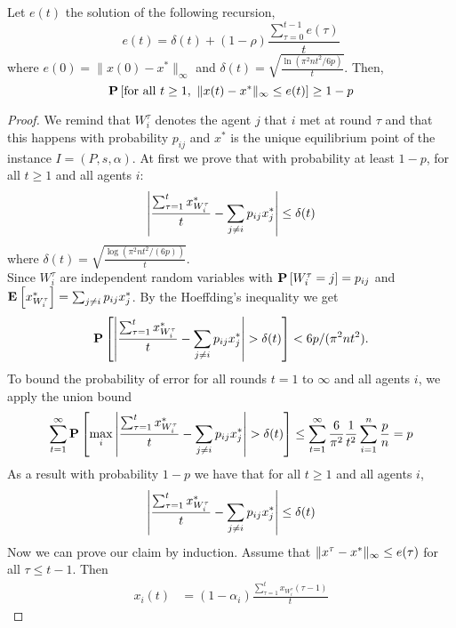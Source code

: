 \begin{lemma}\label{l:recursive_equation}
Let $e(t)$ the solution of the following recursion,
\[e(t) =\delta(t) + (1-\rho)\frac{\sum_{\tau=0}^{t-1}e(\tau)}{t}\]
where $e(0)=\|x(0) - x^*\|_{\infty}$ and \(\delta(t) = \sqrt{\frac{\ln(\pi^2n t^2/6p)}{t}} \). Then,
\[\bm{\mathrm{P}}\left[\text{for all }t \geq 1, ~\| x(t)-x^* \|_{\infty}\leq e(t)\right] \geq 1-p\] 
\end{lemma}
\begin{proof}
We remind that $W_i^\tau$ denotes the agent
$j$ that $i$ met at round $\tau$ and that this happens 
with probability $p_{ij}$ and $x^*$ is the unique equilibrium point 
of the instance $I=(P,s,\alpha)$. At first we prove that
with probability at least $1-p$, for all $t \geq 1$ and all agents $i$:
\begin{equation}\label{eq:error_per_round}
    \left|
    \frac{\sum_{\tau=1}^t x^*_{W_i^\tau}}{t} -
    \sum_{j \neq i} p_{ij} x^*_j
    \right| \leq \delta(t)
\end{equation}
where $\delta(t) = \sqrt{ \frac{\log(\pi^2 n t^2/(6 p))}{t}}$.\\
Since $W_i^\tau$ are independent random variables with 
$\bm{\mathrm{P}}\left[W_i^\tau = j\right]=p_{ij}$ and \(\Exp{x^*_{W_i^\tau}} = \sum_{j \neq i} p_{ij} x^*_j\).
By the Hoeffding's inequality we get
  \[
    \bm{\mathrm{P}}\left[
      \left|
      \frac{\sum_{\tau = 1}^{t} x^*_{W_i^\tau}}{t}
      - \sum_{j \neq i} p_{ij} x^*_j \right|
      > \delta(t)
     \right]
    < 6 p / (\pi^2 n t^2).
  \]
To bound the probability of error for all rounds $t=1$ to $\infty$
and all agents $i$, we apply the union bound
  \begin{align*}
    \sum_{t=1}^{\infty}
    \bm{\mathrm{P}}\left[ \max_{i}
      \left|
      \frac{\sum_{\tau = 1}^{t} x^*_{W_i^{\tau}}}{t}
      - \sum_{j \neq i} p_{ij} x^*_j \right|
      > \delta(t)\right]
    \leq
    \sum_{t=1}^{\infty} \frac{6}{\pi^2} \frac{1}{t^2} \sum_{i=1}^n \frac{p}{n} =
    p
  \end{align*}
\noindent As a result with probability $1-p$ we have that for all $t\geq 1$ and all agents $i$,
  \begin{equation}\label{eq:error_per_round}
    \left|
    \frac{\sum_{\tau=1}^t x^*_{W_i^\tau}}{t} -
    \sum_{j \neq i} p_{ij} x^*_j
    \right| \leq \delta(t)
  \end{equation}
\noindent Now we can prove our claim by induction. Assume that $\| x^{\tau}-x^* \|_{\infty} \leq e(\tau)$ for all 
$\tau \leq t-1$. Then 
\begin{align}
    x_i(t)
    &=
    (1-\alpha_i)\frac{\sum_{\tau=1}^{t}x_{W_i^{\tau}}(\tau-1)}{t}

\end{align}
\end{proof}
